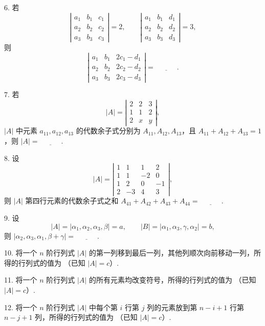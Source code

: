 \documentclass[UTF8, 12pt, fontset=fandol, oneside]{ctexart}
\begin{document}
6. 若
\[
\left|\begin{array}{ccc}
a_1&b_1&c_1\\
a_2&b_2&c_2\\
a_3&b_3&c_3
\end{array}\right|=2,\qquad
\left|\begin{array}{ccc}
a_1&b_1&d_1\\
a_2&b_2&d_2\\
a_3&b_3&d_3
\end{array}\right|=3,
\]
则
\[
\left|\begin{array}{ccc}
a_1&b_1&2c_1-d_1\\
a_2&b_2&2c_2-d_2\\
a_3&b_3&2c_3-d_3
\end{array}\right|=\underline{\hspace{3em}}.
\]

7. 若
\[
|A|=\left|\begin{array}{ccc}
2&2&3\\
1&1&2\\
2&x&y
\end{array}\right|,
\]
$|A|$ 中元素 $a_{11},a_{12},a_{13}$ 的代数余子式分别为 $A_{11},A_{12},A_{13}$，且
$A_{11}+A_{12}+A_{13}=1$，则 $|A|=\underline{\hspace{3em}}$.

8. 设
\[
|A|=\left|\begin{array}{cccc}
1&1&1&2\\
1&1&-2&0\\
1&2&0&-1\\
2&-3&4&3
\end{array}\right|,
\]
则 $|A|$ 第四行元素的代数余子式之和 $A_{41}+A_{42}+A_{43}+A_{44}=\underline{\hspace{3em}}$.

9. 设
\[
|A|=|\alpha_1,\alpha_2,\alpha_3,\beta|=a,\qquad
|B|=|\alpha_1,\alpha_3,\gamma,\alpha_2|=b,
\]
则 $|\alpha_2,\alpha_3,\alpha_1,\beta+\gamma|=\underline{\hspace{3em}}$.

10. 将一个 $n$ 阶行列式 $|A|$ 的第一列移到最后一列，其他列顺次向前移动一列，所得的行列式的值为
\underline{\hspace{3em}}（已知 $|A|=c$）.

11. 将一个 $n$ 阶行列式 $|A|$ 的所有元素均改变符号，所得的行列式的值为
\underline{\hspace{3em}}（已知 $|A|=c$）.

12. 将一个 $n$ 阶行列式 $|A|$ 中每个第 $i$ 行第 $j$ 列的元素放到第 $n-i+1$ 行第 $n-j+1$ 列，所得的行列式的值为
\underline{\hspace{3em}}（已知 $|A|=c$）.
\end{document}
